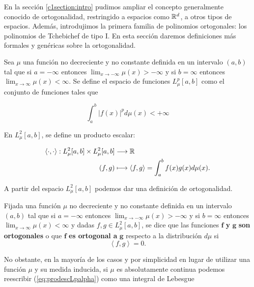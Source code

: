 En la sección \ref{c1section:intro} pudimos ampliar el concepto generalmente conocido de ortogonalidad, restringido a espacios como $\mathbb{R}^d$, a otros tipos de espacios. Además, introdujimos la primera familia de polinomios ortogonales: los polinomios de Tchebichef de tipo I. En esta sección daremos definiciones más formales y genéricas sobre la ortogonalidad.

Sea $\mu$ una función no decreciente y no constante definida en un intervalo $(a,b)$ tal que si $a=-\infty$ entonces $\lim_{x\rightarrow-\infty}\mu(x)>-\infty$ y si $b=\infty$ entonces $\lim_{x\rightarrow\infty}\mu(x)<\infty$. Se define el espacio de funciones $L_\mu^p[a,b]$ como el conjunto de funciones tales que




$$
\int_a^b |f(x)|^p d\mu(x) < +\infty
$$

En $L_\mu^2[a,b]$, se define un producto escalar:

\begin{equation}
    \label{eq:prodescLpalpha}
    \begin{split}
        \left\langle\cdot,\cdot\right\rangle:L_\mu^2[a,b]\times L_\mu^2[a,b] &\longrightarrow \mathbb{R} \\
        (f,g)&\longmapsto \left\langle f,g \right\rangle=\int_a^b f(x)g(x)d\mu(x).
    \end{split}
\end{equation}

A partir del espacio $L_\mu^2[a,b]$ podemos dar una definición de ortogonalidad.

\begin{definicion}[Ortogonalidad]

    Fijada una función $\mu$ no decreciente y no constante definida en un intervalo $(a,b)$ tal que si $a=-\infty$ entonces $\lim_{x\rightarrow-\infty}\mu(x)>-\infty$ y si $b=\infty$ entonces $\lim_{x\rightarrow\infty}\mu(x)<\infty$ y dadas $f,g\in L_\mu^2[a,b]$, se dice que las funciones $\mathbf f$ \textbf y $\mathbf g$ \textbf{son ortogonales} o que $\mathbf f$ \textbf{es ortogonal a} $\mathbf{g}$ respecto a la distribución $d\mu$ si
    \begin{equation}
        \label{eq:defortogonalidad}
        \left\langle f,g\right\rangle = 0.
    \end{equation}
\end{definicion}

No obstante, en la mayoría de los casos y por simplicidad en lugar de utilizar una función $\mu$ y su medida inducida, si $\mu$ es absolutamente continua podemos reescribir (\ref{eq:prodescLpalpha}) como una integral de Lebesgue

